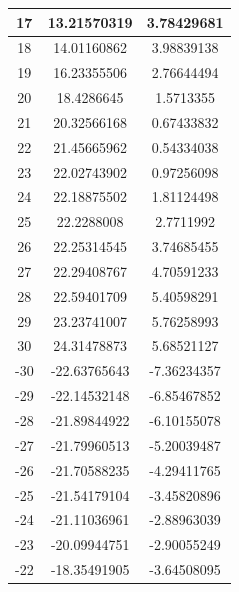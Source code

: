 \begin{longtable}{|c|c|c|}
                \hline
                17 & 13.21570319 & 3.78429681 \\
                \hline
                18 & 14.01160862 & 3.98839138 \\
                \hline
                19 & 16.23355506 & 2.76644494 \\
                \hline
                20 & 18.4286645 & 1.5713355 \\
                \hline
                21 & 20.32566168 & 0.67433832 \\
                \hline
                22 & 21.45665962 & 0.54334038 \\
                \hline
                23 & 22.02743902 & 0.97256098 \\
                \hline
                24 & 22.18875502 & 1.81124498 \\
                \hline
                25 & 22.2288008 & 2.7711992 \\
                \hline
                26 & 22.25314545 & 3.74685455 \\
                \hline
                27 & 22.29408767 & 4.70591233 \\
                \hline
                28 & 22.59401709 & 5.40598291 \\
                \hline
                29 & 23.23741007 & 5.76258993 \\
                \hline
                30 & 24.31478873 & 5.68521127 \\
                \hline
                -30 & -22.63765643 & -7.36234357 \\
                \hline
                -29 & -22.14532148 & -6.85467852 \\
                \hline
                -28 & -21.89844922 & -6.10155078 \\
                \hline
                -27 & -21.79960513 & -5.20039487 \\
                \hline
                -26 & -21.70588235 & -4.29411765 \\
                \hline
                -25 & -21.54179104 & -3.45820896 \\
                \hline
                -24 & -21.11036961 & -2.88963039 \\
                \hline
                -23 & -20.09944751 & -2.90055249 \\
                \hline
                -22 & -18.35491905 & -3.64508095 \\
                \hline

\end{longtable}
